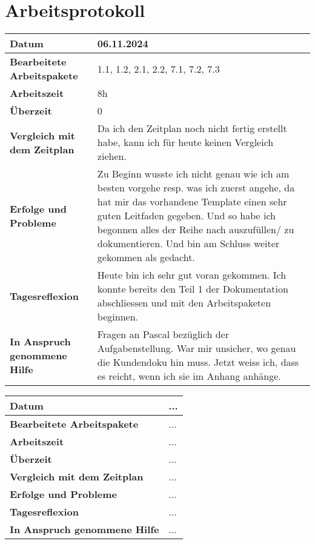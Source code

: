 \chapter{Arbeitsprotokoll}\label{ch:arbeitsprotokoll}
\renewcommand{\arraystretch}{1.5}
\begin{longtable}{p{}|p{}}
    \hline
    \textbf{Datum}                       & 06.11.2024\\
    \hline
    \textbf{Bearbeitete Arbeitspakete}   & 1.1, 1.2, 2.1, 2.2, 7.1, 7.2, 7.3\\
    \hline
    \textbf{Arbeitszeit}                 & 8h \\
    \hline
    \textbf{Überzeit}                    & 0 \\
    \hline
    \textbf{Vergleich mit dem Zeitplan}  & Da ich den Zeitplan noch nicht fertig erstellt habe, kann ich für heute keinen Vergleich ziehen. \\
    \hline
    \textbf{Erfolge und Probleme}        & Zu Beginn wusste ich nicht genau wie ich am besten vorgehe resp. was ich zuerst angehe, da hat mir das vorhandene Template einen sehr guten Leitfaden gegeben. Und so habe ich begonnen alles der Reihe nach auszufüllen/ zu dokumentieren. Und bin am Schluss weiter gekommen als gedacht.\\
    \hline
    \textbf{Tagesreflexion}              & Heute bin ich sehr gut voran gekommen. Ich konnte bereits den Teil 1 der Dokumentation abschliessen und mit den Arbeitspaketen beginnen.
    \\
    \hline
    \textbf{In Anspruch genommene Hilfe} & Fragen an Pascal bezüglich der Aufgabenstellung. War mir unsicher, wo genau die Kundendoku hin muss. Jetzt weiss ich, dass es reicht, wenn ich sie im Anhang anhänge.\\
    \hline
\end{longtable}\label{tab:arbeitsprotokoll-...} 

\newpage

\begin{longtable}{p{}|p{}}
	\hline
	\textbf{Datum}                       & ... \\
	\hline
	\textbf{Bearbeitete Arbeitspakete}   & ... \\
	\hline
	\textbf{Arbeitszeit}                 & ... \\
	\hline
	\textbf{Überzeit}                    & ... \\
	\hline
	\textbf{Vergleich mit dem Zeitplan}  & ... \\
	\hline
	\textbf{Erfolge und Probleme}        & ...
	\\
	\hline
	\textbf{Tagesreflexion}              & ...\\
	\hline
	\textbf{In Anspruch genommene Hilfe} & ... \\
	\hline
\end{longtable}\label{tab:arbeitsprotokoll-...}

